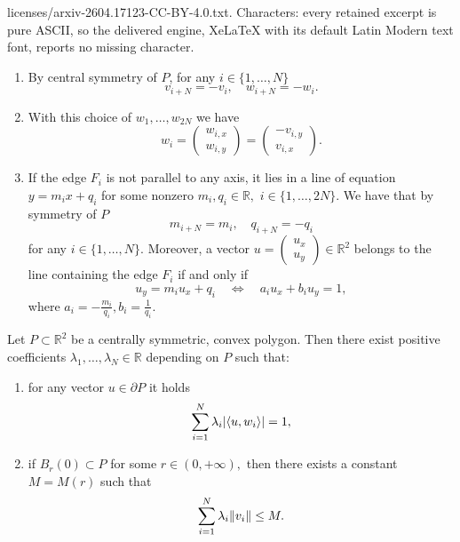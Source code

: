 \documentclass[10pt,a4paper]{amsart}
\DeclarePairedDelimiter{\norma}{\lVert}{\rVert} %
\DeclarePairedDelimiter{\valass}{\lvert}{\rvert} %
\newcommand{\prodscal}[2]{\langle{#1} , {#2} \rangle}
\newcommand{\rgrande}{\mathbb{R}}
\begin{document}
licenses/arxiv-2604.17123-CC-BY-4.0.txt. Characters: every retained excerpt is pure ASCII, so the delivered engine, XeLaTeX with its default Latin Modern text font, reports no missing character.
\begin{rem}\label{remverticiefacce}
    \rm
    \begin{enumerate}
        \item By central symmetry of $P$, for any $i \in \{ 1, \dots, N \}$
        $$
        v_{i+ N} = - v_i, \quad w_{i+ N} = - w_i.
        $$
        \item With this choice of $w_1, \dots, w_{2N}$ we have
        $$
        w_i = \begin{pmatrix}
        w_{i,x} \\
        w_{i,y}
        \end{pmatrix} = \begin{pmatrix}
        -v_{i,y} \\
        v_{i,x}
        \end{pmatrix}
        \text{.}
        $$
        \item If the edge $F_i$ is not parallel to any axis, it lies in a line of equation $ y = m_i x + q_i$ for some nonzero $m_i, q_i \in \rgrande,$ $i \in \{ 1, \dots, 2N \}.$ We have that by symmetry of $P$
        $$
        m_{i +N} = m_i, \quad q_{i + N} = -q_i
        $$
        for any $i \in \{ 1, \dots, N\}.$
        Moreover, a vector $u = \begin{pmatrix}
            u_x \\
            u_y
        \end{pmatrix} \in \rgrande^2$ belongs to the line containing the edge $F_i$ if and only if
        $$
        u_y = m_iu_x + q_i
        \quad
        \iff
        \quad
        a_i u_x + b_i u_y = 1,
        $$
        where $a_i = -\frac{m_i}{q_i}, b_i = \frac{1}{q_i}.$
    \end{enumerate}
\end{rem}

\begin{proposition}\label{igperpoligoni}
Let $P \subset \rgrande^2$ be a centrally symmetric, convex polygon.
Then there exist positive coefficients $\lambda_1, \dots, \lambda_{N} \in \rgrande$ depending on $P$ such that:
\begin{enumerate}
\item\label{enumigperpoligono} for any vector $u \in \partial P$ it holds
\begin{equation}\label{eqigperpoligonipiani}
\sum_{i = 1}^{N} \lambda_i \valass{\prodscal{u}{w_i}} =1,
\end{equation}
\item if $B_r(0) \subset P$ for some $r \in (0, + \infty),$ then there exists a constant $M = M(r)$ such that
    $$
    \sum_{i=1}^{N} \lambda_i \norma{v_i} \leq M.
    $$
\end{enumerate}
\end{proposition}
\end{document}
